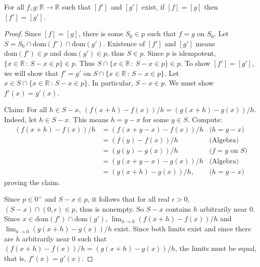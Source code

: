\documentclass[10pt,a4paper]{amsart}
\begin{document}
\begin{theorem}
\label{firsttheorem}
    For all $f,g:\mathbb R\to\mathbb R$ such that $[f']$ and $[g']$ exist,
    if $[f]=[g]$ then $[f']=[g']$.
\end{theorem}

\begin{proof}
    Since $[f]=[g]$, there is some $S_0\in p$ such that
    $f=g$ on $S_0$. Let $S=S_0\cap \mathrm{dom}(f')\cap \mathrm{dom}(g')$.
    Existence of $[f']$ and $[g']$ means $\mathrm{dom}(f')\in p$
    and $\mathrm{dom}(g')\in p$, thus $S\in p$.
    Since $p$ is idempotent, $\{x\in\mathbb R\,:\,S-x\in p\}\in p$.
    Thus $S\cap \{x\in\mathbb R\,:\,S-x\in p\}\in p$.
    To show $[f']=[g']$, we will show that
    $f'=g'$ on $S\cap \{x\in\mathbb R\,:\,S-x\in p\}$.
    Let $x\in S\cap \{x\in\mathbb R\,:\,S-x\in p\}$.
    In particular, $S-x\in p$. We must show $f'(x)=g'(x)$.

    Claim: For all $h\in S-x$, $(f(x+h)-f(x))/h=(g(x+h)-g(x))/h$.
    Indeed, let $h\in S-x$. This means $h=y-x$ for some $y\in S$.
    Compute:
    \begin{align*}
        (f(x+h)-f(x))/h
            &= (f(x+y-x)-f(x))/h
                &\mbox{($h=y-x$)}\\
            &= (f(y)-f(x))/h
                &\mbox{(Algebra)}\\
            &= (g(y)-g(x))/h
                &\mbox{($f=g$ on $S$)}\\
            &= (g(x+y-x)-g(x))/h
                &\mbox{(Algebra)}\\
            &= (g(x+h)-g(x))/h,
                &\mbox{($h=y-x$)}
    \end{align*}
    proving the claim.

    Since $p\in0^+$ and $S-x\in p$,
    it follows that for all real $\epsilon>0$, $(S-x)\cap (0,\epsilon)\in p$,
    thus is nonempty.
    So $S-x$ contains $h$ arbitrarily near $0$.
    Since $x\in \mathrm{dom}(f')\cap \mathrm{dom}(g')$,
    $\lim_{h\to 0}(f(x+h)-f(x))/h$ and $\lim_{h\to 0}(g(x+h)-g(x))/h$
    exist. Since both limits exist and since there are $h$ arbitrarily near $0$
    such that $(f(x+h)-f(x))/h=(g(x+h)-g(x))/h$,
    the limits must be equal, that is, $f'(x)=g'(x)$.
\end{proof}
\end{document}
